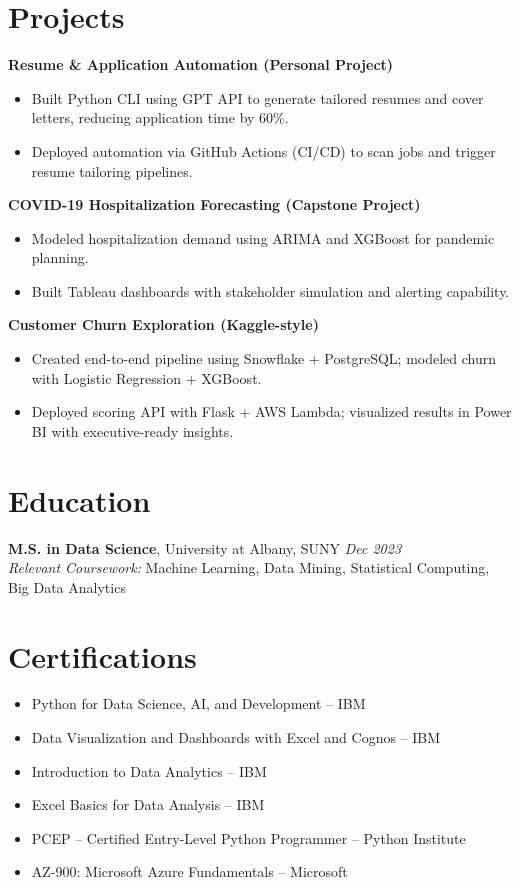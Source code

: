 \documentclass[11pt,a4paper]{article}
\newcommand{\dateright}[1]{\hfill{\small\textit{#1}}}
\newcommand{\sectionneed}{\Needspace{3\baselineskip}}
\begin{document}
\sectionneed
\section*{Projects}

\noindent\textbf{Resume \& Application Automation (Personal Project)}\\
\begin{itemize}
    \item Built Python CLI using GPT API to generate tailored resumes and cover letters, reducing application time by 60\%.
    \item Deployed automation via GitHub Actions (CI/CD) to scan jobs and trigger resume tailoring pipelines.
\end{itemize}

\vspace{2pt}
\noindent\textbf{COVID-19 Hospitalization Forecasting (Capstone Project)}\\
\begin{itemize}
    \item Modeled hospitalization demand using ARIMA and XGBoost for pandemic planning.
    \item Built Tableau dashboards with stakeholder simulation and alerting capability.
\end{itemize}

\vspace{2pt}
\noindent\textbf{Customer Churn Exploration (Kaggle-style)}\\
\begin{itemize}
    \item Created end-to-end pipeline using Snowflake + PostgreSQL; modeled churn with Logistic Regression + XGBoost.
    \item Deployed scoring API with Flask + AWS Lambda; visualized results in Power BI with executive-ready insights.
\end{itemize}

\sectionneed
\section*{Education}
\textbf{M.S. in Data Science}, University at Albany, SUNY \dateright{Dec 2023}\\
\textit{Relevant Coursework:} Machine Learning, Data Mining, Statistical Computing, Big Data Analytics

\sectionneed
\section*{Certifications}
\begin{itemize}
    \item Python for Data Science, AI, and Development – IBM
    \item Data Visualization and Dashboards with Excel and Cognos – IBM
    \item Introduction to Data Analytics – IBM
    \item Excel Basics for Data Analysis – IBM
    \item PCEP – Certified Entry-Level Python Programmer – Python Institute
    \item AZ-900: Microsoft Azure Fundamentals – Microsoft
\end{itemize}
\end{document}
